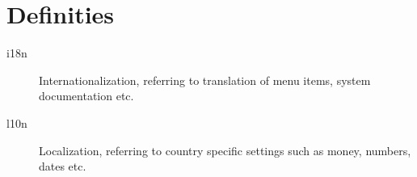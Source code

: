 \documentclass[a4paper,11pt]{article}
\begin{document}









\appendix

\section{Definities}
\begin{description}
 \item[i18n] Internationalization, referring to translation of menu items, system documentation etc.
 \item[l10n] Localization, referring to country specific settings such as money, numbers, dates etc.
\end{description}


\end{document}
